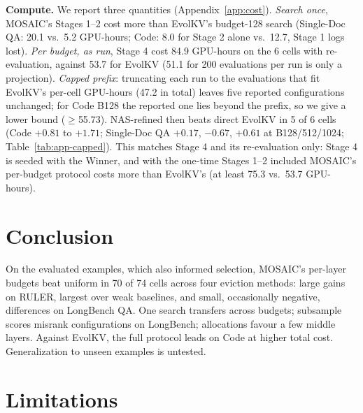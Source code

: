 \documentclass[11pt]{article}
\begin{document}
\textbf{Compute.} We report three quantities (Appendix~\ref{app:cost}). \emph{Search once}, MOSAIC's Stages 1--2 cost more than EvolKV's budget-128 search (Single-Doc QA: 20.1 vs.\ 5.2 GPU-hours; Code: 8.0 for Stage 2 alone vs.\ 12.7, Stage 1 logs lost). \emph{Per budget, as run}, Stage 4 cost 84.9 GPU-hours on the 6 cells with re-evaluation, against 53.7 for EvolKV (51.1 for 200 evaluations per run is only a projection). \emph{Capped prefix}: truncating each run to the evaluations that fit EvolKV's per-cell GPU-hours (47.2 in total) leaves five reported configurations unchanged; for Code B128 the reported one lies beyond the prefix, so we give a lower bound ($\geq$55.73). NAS-refined then beats direct EvolKV in 5 of 6 cells (Code $+0.81$ to $+1.71$; Single-Doc QA $+0.17$, $-0.67$, $+0.61$ at B128/512/1024; Table~\ref{tab:app-capped}). This matches Stage 4 and its re-evaluation only: Stage 4 is seeded with the Winner, and with the one-time Stages 1--2 included MOSAIC's per-budget protocol costs more than EvolKV's (at least 75.3 vs.\ 53.7 GPU-hours).

\section{Conclusion}

On the evaluated examples, which also informed selection, MOSAIC's per-layer budgets beat uniform in 70 of 74 cells across four eviction methods: large gains on RULER, largest over weak baselines, and small, occasionally negative, differences on LongBench QA. One search transfers across budgets; subsample scores misrank configurations on LongBench; allocations favour a few middle layers. Against EvolKV, the full protocol leads on Code at higher total cost. Generalization to unseen examples is untested.

\section*{Limitations}
\end{document}
